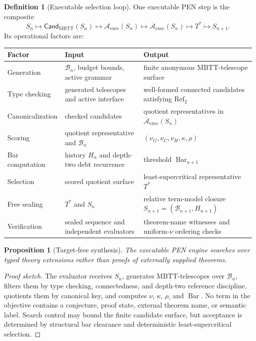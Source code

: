 \documentclass[11pt]{article}
\theoremstyle{plain}
\newtheorem{proposition}[theorem]{Proposition}
\theoremstyle{definition}
\newtheorem{definition}[theorem]{Definition}
\theoremstyle{remark}
\newenvironment{proofsketch}{\begin{proof}[Proof sketch]}{\end{proof}}
\newcommand{\MBTT}{\mathrm{MBTT}}
\newcommand{\B}{\mathcal{B}}
\newcommand{\A}{\mathcal{A}}
\newcommand{\Cand}{\mathsf{Cand}}
\newcommand{\SelBar}{\operatorname{Bar}}
\begin{document}
\begin{definition}[Executable selection loop]
One executable PEN step is the composite
\[
S_n
\longmapsto
\Cand_{\MBTT}(S_n)
\longmapsto
\A_{\mathrm{exec}}(S_n)
\longmapsto
\overline{\A}_{\mathrm{exec}}(S_n)
\longmapsto
T^*
\longmapsto
S_{n+1}.
\]
Its operational factors are:
\begin{center}
\small
\begin{tabularx}{\textwidth}{@{}l Y Y@{}}
\toprule
Factor & Input & Output \\
\midrule
Generation & \(\B_n\), budget bounds, active grammar & finite anonymous \(\MBTT\)-telescope surface \\
Type checking & generated telescopes and active interface & well-formed connected candidates satisfying \(\mathrm{Ref}_2\) \\
Canonicalization & checked candidates & quotient representatives in \(\overline{\A}_{\mathrm{exec}}(S_n)\) \\
Scoring & quotient representative and \(\B_n\) & \((\nu_G,\nu_C,\nu_H,\kappa,\rho)\) \\
Bar computation & history \(H_n\) and depth-two debt recurrence & threshold \(\SelBar_{n+1}\) \\
Selection & scored quotient surface & least-supercritical representative \(T^*\) \\
Free sealing & \(T^*\) and \(S_n\) & relative term-model closure \(S_{n+1}=(\B_{n+1},H_{n+1})\) \\
Verification & sealed sequence and independent evaluators & theorem-name witnesses and uniform-\(\nu\) ordering checks \\
\bottomrule
\end{tabularx}
\end{center}
\end{definition}

\begin{proposition}[Target-free synthesis]
The executable PEN engine searches over typed theory extensions rather than proofs of externally supplied theorems.
\end{proposition}

\begin{proofsketch}
The evaluator receives \(S_n\), generates \(\MBTT\)-telescopes over \(\B_n\), filters them by type checking, connectedness, and depth-two reference discipline, quotients them by canonical key, and computes \(\nu\), \(\kappa\), \(\rho\), and \(\SelBar\). No term in the objective contains a conjecture, proof state, external theorem name, or semantic label. Search control may bound the finite candidate surface, but acceptance is determined by structural bar clearance and deterministic least-supercritical selection.
\end{proofsketch}
\end{document}
